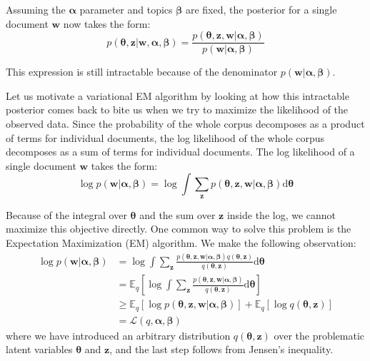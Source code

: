 \documentclass{article}
\newcommand{\diff}{\mathrm{d}}
\begin{document}
Assuming the $\bm{\alpha}$ parameter and topics $\bm{\beta}$ are fixed, the posterior for a single document $\mathbf{w}$ now takes the form:
\begin{equation}
p(\bm{\theta}, \mathbf{z} | \mathbf{w}, \bm{\alpha}, \bm{\beta}) =
\frac{p(\bm{\theta}, \mathbf{z}, \mathbf{w} | \bm{\alpha}, \bm{\beta})}
		{p(\mathbf{w} | \bm{\alpha}, \bm{\beta})} 
\end{equation}

This expression is still intractable because of the denominator $p(\mathbf{w} | \bm{\alpha}, \bm{\beta})$. 

Let us motivate a variational EM algorithm by looking at how this intractable posterior comes back to bite us when we try to maximize the likelihood of the observed data. Since the probability of the whole corpus decomposes as a product of terms for individual documents, the log likelihood of the whole corpus decomposes as a sum of terms for individual documents. The log likelihood of a single document $\mathbf{w}$ takes the form:
\begin{equation}
\log p(\mathbf{w} | \bm{\alpha}, \bm{\beta}) =
	\log \int \sum_{\mathbf{z}} p (\bm{\theta}, \mathbf{z}, \mathbf{w} | \bm{\alpha}, \bm{\beta}) \diff\bm{\theta} 
\end{equation}

Because of the integral over $\bm{\theta}$ and the sum over $\mathbf{z}$ inside the log, we cannot maximize this objective directly. One common way to solve this problem is the Expectation Maximization (EM) algorithm. We make the following observation:
\begin{align*}
\log p(\mathbf{w} | \bm{\alpha}, \bm{\beta}) 
&= \log \int \sum_{\mathbf{z}} \frac{p (\bm{\theta}, \mathbf{z}, \mathbf{w} | \bm{\alpha}, \bm{\beta}) q(\bm{\theta}, \mathbf{z})}{q(\bm{\theta}, \mathbf{z})}  \diff\bm{\theta} \\
&= \mathbb{E}_q \left[\log \int \sum_{\mathbf{z}} \frac{p (\bm{\theta}, \mathbf{z}, \mathbf{w} | \bm{\alpha}, \bm{\beta})}{q(\bm{\theta}, \mathbf{z})}  \diff\bm{\theta}\right] \\
&\geq \mathbb{E}_q \left[\log p(\bm{\theta}, \mathbf{z}, \mathbf{w} | \bm{\alpha}, \bm{\beta})\right] + \mathbb{E}_q \left[\log q(\bm{\theta}, \mathbf{z})\right] \\
&= \mathcal{L}(q, \bm{\alpha}, \bm{\beta})
\end{align*}
where we have introduced an arbitrary distribution $q(\bm{\theta}, \mathbf{z})$ over the problematic latent variables $\bm{\theta}$ and $\mathbf{z}$, and the last step follows from Jensen's inequality.
\end{document}
